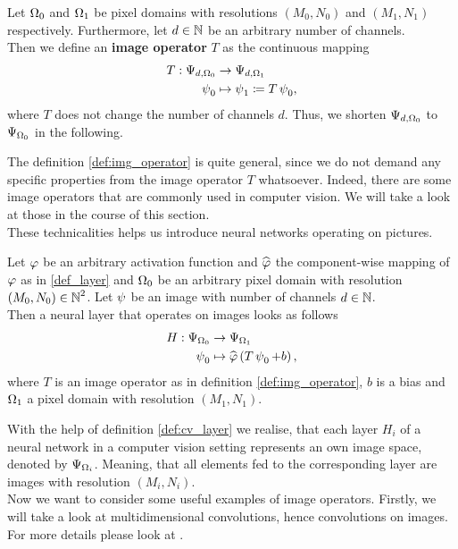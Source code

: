 \begin{definition}\label{def:img_operator}
Let $\Omega_0$ and $\Omega_1$ be pixel domains with resolutions $(M_0,N_0)$ and $(M_1,N_1)$ respectively. Furthermore, let $d\in\operatorname{\mathbb{N}}$ be an arbitrary number of channels.\\
Then we define an \textbf{image operator} $T$ as the continuous mapping
\begin{align*}
T: \Psi_{d,\Omega_0} &\to \Psi_{d,\Omega_1}\\
\operatorname{\psi}_0 &\mapsto \operatorname{\psi}_1 \coloneqq T \operatorname{\psi}_0,
\end{align*}
where $T$ does not change the number of channels $d$. Thus, we shorten $\Psi_{d,\Omega_0}$ to $\Psi_{\Omega_0}$ in the following.
\end{definition}

The definition \ref{def:img_operator} is quite general, since we do not demand any specific properties from the image operator $T$ whatsoever. Indeed, there are some image operators that are commonly used in computer vision. We will take a look at those in the course of this section.\\
These technicalities helps us introduce neural networks operating on pictures.

\begin{definition}\label{def:cv_layer}
Let $\operatorname{\varphi}$ be an arbitrary activation function and $\widehat{\operatorname{\varphi}}$ the component-wise mapping of $\operatorname{\varphi}$ as in \ref{def_layer} and $\Omega_0$ be an arbitrary pixel domain with resolution $(M_0,N_0)\in\operatorname{\mathbb{N}}^2$. Let $\operatorname{\psi}$ be an image with number of channels $d\in\operatorname{\mathbb{N}}$.\\
Then a neural layer that operates on images looks as follows
\begin{align*}
H: \Psi_{\Omega_0} &\to \Psi_{\Omega_1}\\
\operatorname{\psi}_0 &\mapsto \widehat{\operatorname{\varphi}}\left(T\operatorname{\psi}_0 + b\right),
\end{align*}
where $T$ is an image operator as in definition \ref{def:img_operator}, $b$ is a bias and $\Omega_1$ a pixel domain with resolution $(M_1,N_1)$.
\end{definition}

With the help of definition \ref{def:cv_layer} we realise, that each layer $H_i$ of a neural network in a computer vision setting represents an own image space, denoted by $\Psi_{\Omega_i}$. Meaning, that all elements fed to the corresponding layer are images with resolution $(M_i,N_i)$.\\
Now we want to consider some useful examples of image operators. Firstly, we will take a look at multidimensional convolutions, hence convolutions on images. For more details please look at \cite[chapter~9]{goodfellow2016deep}.


